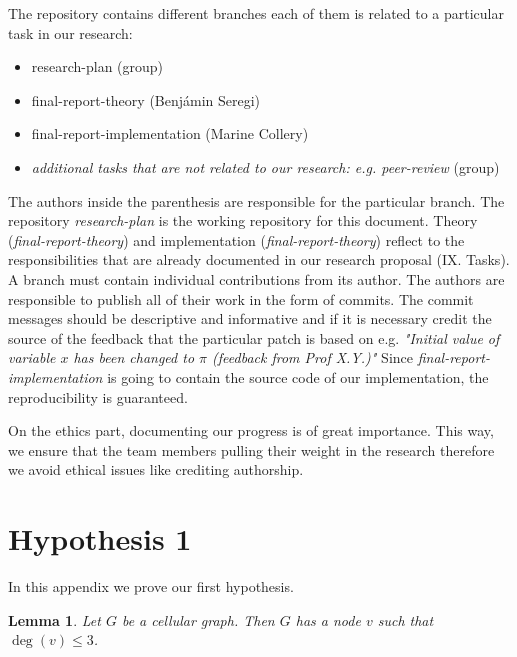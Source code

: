 \documentclass[letterpaper, 10 pt, conference]{ieeeconf}  %
\newtheorem{lem}{Lemma}
\begin{document}
The repository contains different branches each of them is related to a particular task in our research:
\begin{itemize}
\item research-plan (group)
\item final-report-theory (Benjámin Seregi)
\item final-report-implementation (Marine Collery)
\item \textit{additional tasks that are not related to our research: e.g. peer-review} (group)
\end{itemize}
The authors inside the parenthesis are responsible for the particular branch. The repository \textit{research-plan} is the working repository for this document. Theory (\textit{final-report-theory}) and implementation (\textit{final-report-theory}) reflect to the responsibilities that are already documented in our research proposal (IX. Tasks).
A branch must contain individual contributions from its author. The authors are responsible to publish all of their work in the form of commits. The commit messages should be descriptive and informative and if it is necessary credit the source of the feedback that the particular patch is based on e.g. \textit{"Initial value of variable $x$ has been changed to $\pi$ (feedback from Prof X.Y.)"}
Since \textit{final-report-implementation} is going to contain the source code of our implementation, the reproducibility is guaranteed.

On the ethics part, documenting our progress is of great importance. This way, we ensure that the team members pulling their weight in the research therefore we avoid ethical issues like crediting authorship.

\appendices

\section{Hypothesis 1}
In this appendix we prove our first hypothesis.

\begin{lem}\label{lem:degree-constraint}
Let $G$ be a cellular graph. Then $G$ has a node $v$ such that $\deg(v) \leq 3$.
\end{lem}
\end{document}
